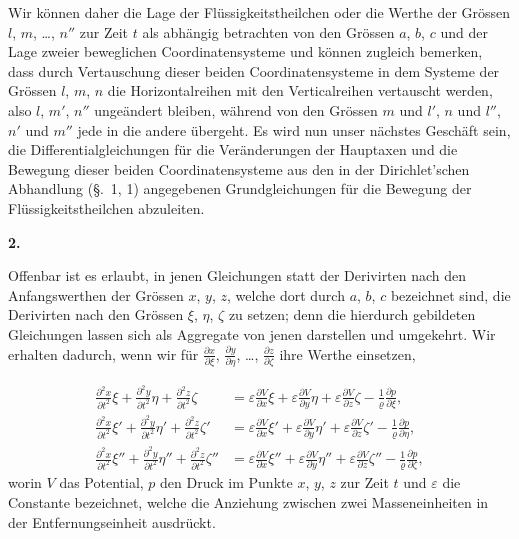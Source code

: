 \documentclass[12pt,a4paper]{book}
\theoremstyle{definition}
\theoremstyle{remark}
\begin{document}
Wir k\"onnen daher die Lage der Fl\"ussigkeitstheilchen oder die Werthe der Gr\"ossen $l$, $m$, \dots, $n''$ zur Zeit $t$ als abh\"angig betrachten von den Gr\"ossen $a$, $b$, $c$ und der Lage zweier beweglichen Coordinatensysteme und k\"onnen zugleich bemerken, dass durch Vertauschung dieser beiden Coordinatensysteme in dem Systeme der Gr\"ossen $l$, $m$, $n$ die Horizontalreihen mit den Verticalreihen vertauscht werden, also $l$, $m'$, $n''$ unge\"andert bleiben, w\"ahrend von den Gr\"ossen $m$ und $l'$, $n$ und $l''$, $n'$ und $m''$ jede in die andere \"ubergeht. Es wird nun unser n\"achstes Gesch\"aft sein, die Differentialgleichungen f\"ur die Ver\"anderungen der Hauptaxen und die Bewegung dieser beiden Coordinatensysteme aus den in der Dirichlet'schen Abhandlung (\S.~1, 1) angegebenen Grundgleichungen f\"ur die Bewegung der Fl\"ussigkeitstheilchen abzuleiten.

\begin{center}
\textbf{2.}
\end{center}

Offenbar ist es erlaubt, in jenen Gleichungen statt der Derivirten nach den Anfangswerthen der Gr\"ossen $x$, $y$, $z$, welche dort durch $a$, $b$, $c$ bezeichnet sind, die Derivirten nach den Gr\"ossen $\xi$, $\eta$, $\zeta$ zu setzen; denn die hierdurch gebildeten Gleichungen lassen sich als Aggregate von jenen darstellen und umgekehrt. Wir erhalten dadurch, wenn wir f\"ur $\frac{\partial x}{\partial\xi}$, $\frac{\partial y}{\partial\eta}$, \dots, $\frac{\partial z}{\partial\zeta}$ ihre Werthe einsetzen,

\begin{align*}
\frac{\partial^{2}x}{\partial t^{2}}\xi + \frac{\partial^{2}y}{\partial t^{2}}\eta + \frac{\partial^{2}z}{\partial t^{2}}\zeta &= \varepsilon\frac{\partial V}{\partial x}\xi + \varepsilon\frac{\partial V}{\partial y}\eta + \varepsilon\frac{\partial V}{\partial z}\zeta - \frac{1}{\varrho}\frac{\partial p}{\partial\xi},\\
\frac{\partial^{2}x}{\partial t^{2}}\xi' + \frac{\partial^{2}y}{\partial t^{2}}\eta' + \frac{\partial^{2}z}{\partial t^{2}}\zeta' &= \varepsilon\frac{\partial V}{\partial x}\xi' + \varepsilon\frac{\partial V}{\partial y}\eta' + \varepsilon\frac{\partial V}{\partial z}\zeta' - \frac{1}{\varrho}\frac{\partial p}{\partial\eta},\\
\frac{\partial^{2}x}{\partial t^{2}}\xi'' + \frac{\partial^{2}y}{\partial t^{2}}\eta'' + \frac{\partial^{2}z}{\partial t^{2}}\zeta'' &= \varepsilon\frac{\partial V}{\partial x}\xi'' + \varepsilon\frac{\partial V}{\partial y}\eta'' + \varepsilon\frac{\partial V}{\partial z}\zeta'' - \frac{1}{\varrho}\frac{\partial p}{\partial\zeta},\tag{1}
\end{align*}
worin $V$ das Potential, $p$ den Druck im Punkte $x$, $y$, $z$ zur Zeit $t$ und $\varepsilon$ die Constante bezeichnet, welche die Anziehung zwischen zwei Masseneinheiten in der Entfernungseinheit ausdr\"uckt.
\end{document}
